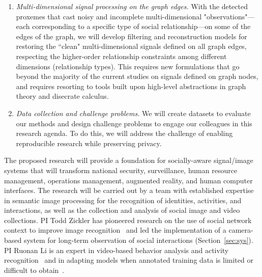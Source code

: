 \begin{enumerate}
\vspace{-0.1in}\item \emph{Multi-dimensional signal processing on the graph edges.} With the detected proxemes that cast noisy and incomplete multi-dimensional "observations"---each corresponding to a specific type of social relationship---on some of the edges of the graph, we will develop filtering and reconstruction models for restoring the ``clean" multi-dimensional signals defined on all graph edges, respecting the higher-order relationship constraints among different dimensions (relationship types). This requires new formulations that go beyond the majority of the current studies on signals defined on graph nodes, and requires resorting to tools built upon high-level abstractions in graph theory and disecrate calculus.


\vspace{-0.1in}\item \emph{Data collection and challenge problems.} We will create datasets to evaluate our methods and design challenge problems to engage our colleagues in this research agenda. To do this, we will address the challenge of enabling reproducible research while preserving privacy.

\end{enumerate}

\vspace{-5pt}
The proposed research will provide a foundation for socially-aware signal/image systems that will transform national security, surveillance, human resource management, operations management, augmented reality, and human computer interfaces. The research will be carried out by a team with established expertise in semantic image processing for the recognition of identities, activities, and interactions, as well as the collection and analysis of social image and video collections. PI Todd Zickler has pioneered research on the use of social network context to improve image recognition~\cite{Stone2008,Stone2010} and led the implementation of a camera-based system for long-term observation of social interactions (Section~\ref{sec:sys}). PI Ruonan Li is an expert in video-based behavior analysis and activity recognition~\cite{groupdet2013,LiIJCV2012,LiPAMI2012,Li2010} and in adapting models when annotated training data is limited or difficult to obtain~\cite{LiZickler2012,Li2011}. 







